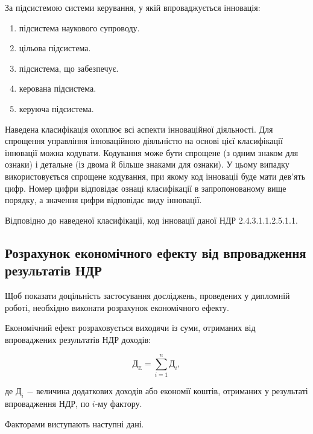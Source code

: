 За підсистемою системи керування, у якій впроваджується інновація:

\begin{enumerate}
	\item підсистема наукового супроводу.
	\item цільова підсистема.
	\item підсистема, що забезпечує.
	\item керована підсистема.
	\item керуюча підсистема.
\end{enumerate}

Наведена класифікація охоплює всі аспекти інноваційної діяльності. Для спрощення управління інноваційною діяльністю на основі цієї класифікації інновації можна кодувати. Кодування може бути спрощене (з одним знаком для ознаки) і детальне (із двома й більше знаками для ознаки). У цьому випадку використовується спрощене кодування, при якому код інновації буде мати дев'ять цифр. Номер цифри відповідає ознаці класифікації в запропонованому вище порядку, а значення цифри відповідає виду інновації.

Відповідно до наведеної класифікації, код інновації даної НДР 2.4.3.1.1.2.5.1.1.

\vspace{1.5em}

\subsection{Розрахунок економічного ефекту від впровадження результатів НДР}

Щоб показати доцільність застосування досліджень, проведених у дипломній роботі, необхідно виконати розрахунок економічного ефекту.

Економічний ефект розраховується виходячи із суми, отриманих від впроваджених результатів НДР доходів: 

\begin{equation}\label{eq:economy11}
	\text{Д}_{\text{Е}} = \sum_{i=1}^{n}\text{Д}_{i},
\end{equation}

\noindent де $\text{Д}_{i}$ $-$ величина додаткових доходів або економії коштів, отриманих у\newline
\hspace*{15pt}результаті впровадження НДР, по $i$-му фактору. 

\vspace{1.5em}

Факторами виступають наступні дані.

